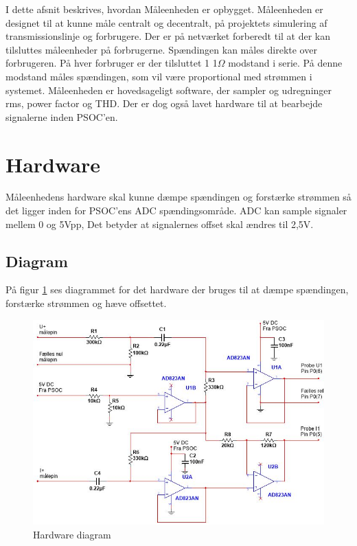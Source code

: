 
I dette afsnit beskrives, hvordan Måleenheden er opbygget. Måleenheden er designet til at kunne måle centralt og decentralt, på projektets simulering af transmissionslinje og forbrugere. Der er på netværket forberedt til at der kan tilsluttes måleenheder på forbrugerne. Spændingen kan måles direkte over forbrugeren. På hver forbruger er der tilsluttet 1 1$\Omega$ modstand i serie. På denne modstand måles spændingen, som vil være proportional med strømmen i systemet. Måleenheden er hovedsageligt software, der sampler og udregninger rms, power factor og THD. Der er dog også lavet hardware til at bearbejde signalerne inden PSOC'en.


\section{Hardware}
Måleenhedens hardware skal kunne dæmpe spændingen og forstærke strømmen så det ligger inden for PSOC'ens ADC spændingsområde. ADC kan sample signaler mellem 0 og 5Vpp, Det betyder at signalernes offset skal ændres til 2,5V.

\subsection{Diagram}
På figur \ref{fig:MaalDiagram} ses diagrammet for det hardware der bruges til at dæmpe spændingen, forstærke strømmen og hæve offsettet.

\begin{figure}[H] %
	\centering
	\includegraphics[width=\textwidth]{Figure/MaalHardware}
	\caption{Hardware diagram}
	\label{fig:MaalDiagram}
\end{figure}


